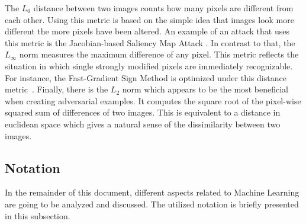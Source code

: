 The $L_0$ distance between two images counts how many pixels are different from each other.
Using this metric is based on the simple idea that images look more different the more pixels have been altered.
An example of an attack that uses this metric is the Jacobian-based Saliency Map Attack \cite{papernot2016limitations}.
In contrast to that, the $L_\infty$ norm measures the maximum difference of any pixel.
This metric reflects the situation in which single strongly modified pixels are immediately recognizable.
For instance, the Fast-Gradient Sign Method is optimized under this distance metric~\cite{szegedy2015explaining}.
Finally, there is the $L_2$ norm which appears to be the most beneficial when creating adversarial examples.
It computes the square root of the pixel-wise squared sum of differences of two images.
This is equivalent to a distance in euclidean space which gives a natural sense of the dissimilarity between two images.

\subsection{Notation}\label{subsec:notation}
In the remainder of this document, different aspects related to Machine Learning are going to be analyzed and discussed.
The utilized notation is briefly presented in this subsection.

